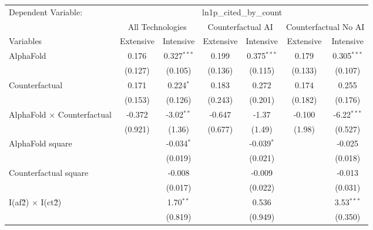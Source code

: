 \begingroup
\centering
\begin{tabular}{lcccccc}
   \tabularnewline \midrule \midrule
   Dependent Variable: & \multicolumn{6}{c}{ln1p\_cited\_by\_count}\\
 & \multicolumn{2}{c}{All Technologies} & \multicolumn{2}{c}{Counterfactual AI} & \multicolumn{2}{c}{Counterfactual No AI} \\
\cmidrule(lr){1-1}\cmidrule(lr){2-3} \cmidrule(lr){4-5} \cmidrule(lr){6-7}
Variables & \multicolumn{1}{c}{Extensive} & \multicolumn{1}{c}{Intensive} & \multicolumn{1}{c}{Extensive} & \multicolumn{1}{c}{Intensive} & \multicolumn{1}{c}{Extensive} & \multicolumn{1}{c}{Intensive} \\
\cmidrule(lr){1-1}\cmidrule(lr){2-2} \cmidrule(lr){3-3} \cmidrule(lr){4-4} \cmidrule(lr){5-5} \cmidrule(lr){6-6} \cmidrule(lr){7-7}
   AlphaFold                          & 0.176   & 0.327$^{***}$ & 0.199   & 0.375$^{***}$ & 0.179   & 0.305$^{***}$\\   
                                      & (0.127) & (0.105)       & (0.136) & (0.115)       & (0.133) & (0.107)\\   
   Counterfactual                     & 0.171   & 0.224$^{*}$   & 0.183   & 0.272         & 0.174   & 0.255\\   
                                      & (0.153) & (0.126)       & (0.243) & (0.201)       & (0.182) & (0.176)\\   
   AlphaFold $\times$ Counterfactual  & -0.372  & -3.02$^{**}$  & -0.647  & -1.37         & -0.100  & -6.22$^{***}$\\   
                                      & (0.921) & (1.36)        & (0.677) & (1.49)        & (1.98)  & (0.527)\\   
   AlphaFold square                   &         & -0.034$^{*}$  &         & -0.039$^{*}$  &         & -0.025\\   
                                      &         & (0.019)       &         & (0.021)       &         & (0.018)\\   
   Counterfactual square              &         & -0.008        &         & -0.009        &         & -0.013\\   
                                      &         & (0.017)       &         & (0.022)       &         & (0.031)\\   
   I(af\^2) $\times$ I(ct\^2)         &         & 1.70$^{**}$   &         & 0.536         &         & 3.53$^{***}$\\   
                                      &         & (0.819)       &         & (0.949)       &         & (0.350)\\   

\end{tabular}
